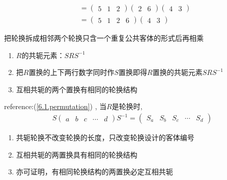\begin{example}[轮换的合并与截断]
\begin{enumerate}
\begin{equation}
\begin{aligned}
	&{}={}\begin{pmatrix}
	5&1&2
	\end{pmatrix}
	\begin{pmatrix}
	2&6
	\end{pmatrix}
	\begin{pmatrix}
	4&3
	\end{pmatrix}\\
	&{}={}\begin{pmatrix}
	5&1&2&6
	\end{pmatrix}
	\begin{pmatrix}
	4&3
	\end{pmatrix}
	\end{aligned}\end{equation}	
	
{\color{seco}把轮换拆成相邻两个轮换只含一个重复公共客体的形式后再相乘}	
	\end{enumerate}	
\end{example}

\begin{newprop}[置换群的类]
	\begin{enumerate}
	\item $R$的共轭元素：$SRS^{-1}$
		
	\item 把$R$置换的上下两行数字同时作$S$置换即得$R$置换的共轭元素$SRS^{-1}$
		
	\item 互相共轭的两个置换有相同的轮换结构
	\end{enumerate}
\end{newprop}


\begin{newproof}
reference:(\ref{6.1.permutation}) ,
当$R$是轮换时,
	\begin{equation}\begin{aligned}
	S
	\begin{pmatrix}a&b&c&\cdots &d\end{pmatrix}
	S^{-1}
	=\begin{pmatrix}S_a&S_b&S_c&\cdots &S_d\end{pmatrix}
	\end{aligned}\end{equation}
	\begin{enumerate}
			
	\item	共轭轮换不改变轮换的长度，只改变轮换设计的客体编号
	
	\item 互相共轭的两置换具有相同的轮换结构
	
	\item 亦可证明，有相同轮换结构的两置换必定互相共轭
	
	\end{enumerate}
\end{newproof}

